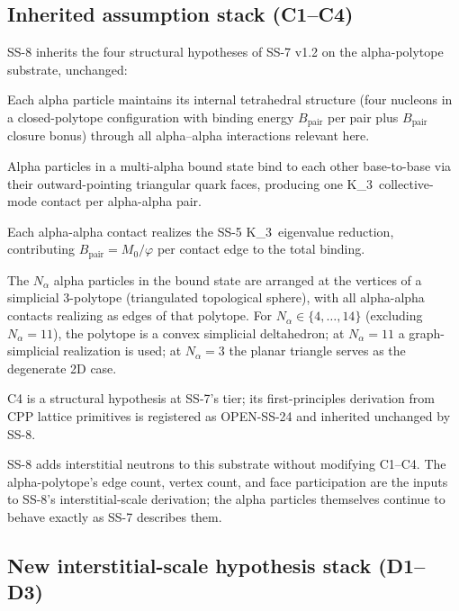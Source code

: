 \documentclass[11pt,letterpaper]{article}
\theoremstyle{definition}
\newcommand{\Mzero}{M_0}
\newcommand{\phig}{\varphi}
\newcommand{\Bpair}{B_{\text{pair}}}
\newcommand{\Nalpha}{N_\alpha}
\newcommand{\Kthree}{K_3}
\begin{document}
\subsection{Inherited assumption stack (C1--C4)}
\label{sec:c1-c4}

SS-8 inherits the four structural hypotheses of SS-7 v1.2 on the alpha-polytope substrate, unchanged:

\begin{description}[leftmargin=1.2cm,style=nextline]
\item[\textbf{C1} (alpha rigidity at nuclear scale)] Each alpha particle maintains its internal tetrahedral structure (four nucleons in a closed-polytope configuration with binding energy $\Bpair$ per pair plus $\Bpair$ closure bonus) through all alpha--alpha interactions relevant here.
\item[\textbf{C2} (alpha-alpha base-to-base contact)] Alpha particles in a multi-alpha bound state bind to each other base-to-base via their outward-pointing triangular quark faces, producing one \Kthree\ collective-mode contact per alpha-alpha pair.
\item[\textbf{C3} (\Kthree\ collective mode at each alpha-alpha contact)] Each alpha-alpha contact realizes the SS-5 \Kthree\ eigenvalue reduction, contributing $\Bpair = \Mzero/\phig$ per contact edge to the total binding.
\item[\textbf{C4} (simplicial alpha-polytope connectivity)] The $\Nalpha$ alpha particles in the bound state are arranged at the vertices of a simplicial 3-polytope (triangulated topological sphere), with all alpha-alpha contacts realizing as edges of that polytope. For $\Nalpha \in \{4, \ldots, 14\}$ (excluding $\Nalpha = 11$), the polytope is a convex simplicial deltahedron; at $\Nalpha = 11$ a graph-simplicial realization is used; at $\Nalpha = 3$ the planar triangle serves as the degenerate 2D case.
\end{description}

C4 is a structural hypothesis at SS-7's tier; its first-principles derivation from CPP lattice primitives is registered as OPEN-SS-24 and inherited unchanged by SS-8.

SS-8 adds interstitial neutrons to this substrate without modifying C1--C4. The alpha-polytope's edge count, vertex count, and face participation are the inputs to SS-8's interstitial-scale derivation; the alpha particles themselves continue to behave exactly as SS-7 describes them.

\subsection{New interstitial-scale hypothesis stack (D1--D3)}
\label{sec:d1-d3}
\end{document}
